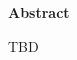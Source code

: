 \thispagestyle{plain}
\begin{center}
	\Large
	\textbf{\thesistitle}
	
	
	\vspace{1.2cm}
	\large
	\peopleheader	
	\textbf{\authornamefl} \hfill \textbf{\supervisors}
	
	\vspace{2.0cm}
	\textbf{Abstract}
\end{center}
TBD